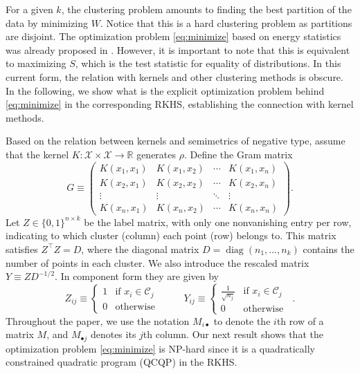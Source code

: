 \documentclass[aps,preprint,nofootinbib,floatfix]{revtex4-1}
\DeclareMathOperator{\diag}{diag}
\newcommand\kk{K}
\newcommand\C{{\mathcal{C}}}
\newcommand\Zt{Y}
\begin{document}
For a given $k$, the clustering problem amounts to
finding the best partition of the data by minimizing $W$.
Notice that this is a hard clustering problem as partitions
are disjoint. The optimization problem \eqref{eq:minimize} based on
energy statistics was already proposed in \cite{Kgroups}. However, it is
important to note that this is equivalent to maximizing $S$,
which is the test statistic for equality of distributions. In this current
form, the relation with kernels and other clustering methods is obscure.
In the following, we show what is the explicit optimization problem behind 
\eqref{eq:minimize} in the corresponding RKHS, 
establishing the connection with kernel methods.

Based on the relation between kernels and semimetrics of negative
type, 
assume that the kernel $\kk: \mathcal{X} \times \mathcal{X} \to \mathbb{R}$ 
generates $\rho$.  Define  the Gram matrix
\begin{equation}
\label{eq:kernel_matrix}
G \equiv \begin{pmatrix}
\kk(x_1,x_1) & \kk(x_1,x_2) & \dotsm & \kk(x_1,x_n) \\
\kk(x_2,x_1) & \kk(x_2,x_2) & \dotsm & \kk(x_2,x_n) \\
\vdots & \vdots & \ddots  & \vdots \\
\kk(x_n,x_1) & \kk(x_n,x_2) & \dotsm & \kk(x_n,x_n) 
\end{pmatrix} .
\end{equation}
Let $Z \in \{ 0,1 \}^{n\times k}$ be the label matrix, 
with only one nonvanishing entry per row, 
indicating to which cluster (column)
each point (row) belongs to. This matrix satisfies
$Z^\top Z = D$, where the diagonal matrix 
$D = \diag( n_1,\dotsc, n_k )$  contains
the number of points in each cluster. We also introduce the rescaled
matrix  $Y \equiv Z D^{-1/2}$. In component form they are given by
\begin{equation}
\label{eq:label_matrix}
Z_{ij} \equiv \begin{cases}
1 & \mbox{if $x_i \in \C_j$ } \\
0 & \mbox{otherwise}
\end{cases} \qquad
\Zt_{ij} \equiv \begin{cases}
\tfrac{1}{\sqrt{n_j}} & \mbox{if $x_i \in \C_j$ } \\
0 & \mbox{otherwise}
\end{cases} .
\end{equation}
Throughout the paper, we use the notation $M_{i\bullet}$ to denote
the $i$th row of a matrix $M$, and $M_{\bullet j}$ denotes its $j$th column.
Our next result shows that the optimization problem \eqref{eq:minimize}
is NP-hard since
it is a quadratically constrained quadratic program (QCQP) in the RKHS.
\end{document}
